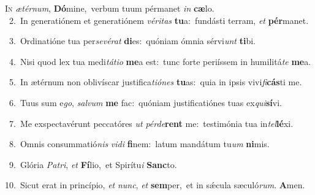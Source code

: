 \lettrine{\initial\textcolor{\initialcolor}{I}}{n} \textit{æ}\-\textit{tér}\textit{num}, \textbf{Dó}\-mine,~\star verbum tuum pérmanet \textit{in} \textbf{cæ}\-lo.\\
{\numbfont\textcolor{\numbcolor}{~2.}}~In generatiónem et generatiónem \textit{vé}\-\textit{ri}\textit{tas} \textbf{tu}\-a:~\star fundásti terram, \textit{et} \textbf{pér}\-manet.\par
{\numbfont\textcolor{\numbcolor}{~3.}}~Ordinatióne tua per\-\textit{se}\-\textit{vé}\textit{rat} \textbf{di}\-es:~\star quóniam ómnia sérvi\textit{unt} \textbf{ti}\-bi.\par
{\numbfont\textcolor{\numbcolor}{~4.}}~Nisi quod lex tua medi\-\textit{tá}\-\textit{ti}\textit{o} \textbf{me}\-a est:~\star tunc forte periíssem in humilitá\textit{te} \textbf{me}\-a.\par
{\numbfont\textcolor{\numbcolor}{~5.}}~In ætérnum non oblivíscar justifica\-\textit{ti}\-\textit{ó}\textit{nes} \textbf{tu}\-as:~\star quia in ipsis vivi\-\textit{fi}\-\textbf{cás}ti me.\par
{\numbfont\textcolor{\numbcolor}{~6.}}~Tuus sum e\-\textit{go}\-, \textit{sal}\-\textit{vum} \textbf{me} fac:~\star quóniam justificatiónes tuas ex\-\textit{qui}\-\textbf{sí}vi.\par
{\numbfont\textcolor{\numbcolor}{~7.}}~Me exspectavérunt peccatóres \textit{ut} \textit{pér}\-\textit{de}\textbf{rent} me:~\star testimónia tua in\-\textit{tel}\-\textbf{lé}xi.\par
{\numbfont\textcolor{\numbcolor}{~8.}}~Omnis consummatió\textit{nis} \textit{vi}\-\textit{di} \textbf{fi}\-nem:~\star latum mandátum tu\textit{um} \textbf{ni}\-mis.\par
{\numbfont\textcolor{\numbcolor}{~9.}}~Glória \textit{Pa}\-\textit{tri}, \textit{et} \textbf{Fí}\-lio,~\star et Spirítu\textit{i} \textbf{Sanc}\-to.\par
{\numbfont\textcolor{\numbcolor}{10.}}~Sicut erat in princípio, \textit{et} \textit{nunc}\-, \textit{et} \textbf{sem}\-per,~\star et in sǽcula sæculó\-\textit{rum}\-. \textbf{A}\-men.\par
